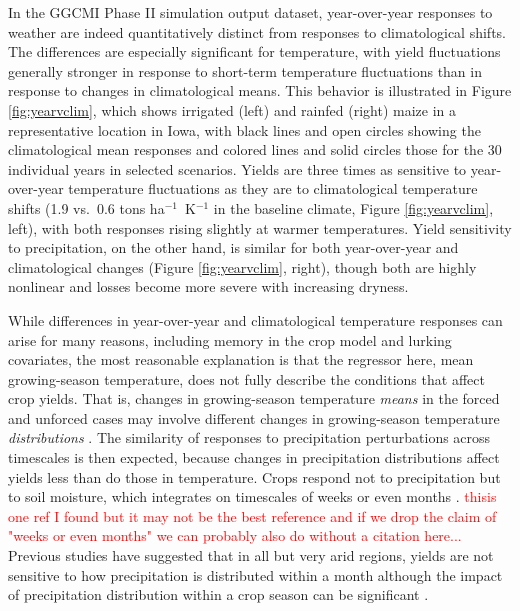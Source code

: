\documentclass[gmd, manuscript]{copernicus} %
\begin{document}
In the GGCMI Phase II simulation output dataset, year-over-year responses to weather are indeed quantitatively distinct from  responses to climatological shifts. 
The differences are especially significant for temperature, with yield fluctuations generally stronger in response to short-term temperature fluctuations than in response to changes in climatological means. 
This behavior is illustrated in Figure \ref{fig:yearvclim}, which shows irrigated (left) and rainfed (right) maize in a representative location in Iowa, with black lines and open circles showing the climatological mean responses and colored lines and solid circles those for the 30 individual years in selected scenarios. Yields are three times as sensitive to year-over-year temperature fluctuations as they are to climatological  temperature shifts (1.9 vs.\ 0.6 tons ha$^{-1}$\ K$^{-1}$ in the baseline climate, Figure \ref{fig:yearvclim}, left), with both responses rising slightly at warmer temperatures.
Yield sensitivity to precipitation, on the other hand, is similar for both year-over-year and climatological changes (Figure \ref{fig:yearvclim}, right), though both are highly nonlinear and losses become more severe with increasing dryness. 

While differences in year-over-year and climatological temperature responses can arise for many reasons, including memory in the crop model and lurking covariates, the most reasonable explanation is that the regressor here, mean growing-season temperature, does not fully describe the conditions that affect crop yields. That is, changes in growing-season temperature \textit{means} in the forced and unforced cases may involve different changes in growing-season temperature \textit{distributions} \citep[e.g.][]{Ruane2016}. 
The similarity of responses to precipitation perturbations across timescales is then expected, because changes in precipitation distributions affect yields less than do those in temperature. 
Crops respond not to precipitation but to soil moisture, which integrates on timescales of weeks or even months \citep[e.g.][]{potter2005effects}. \textcolor{red}{thisis one ref I found but it may not be the best reference and if we drop the claim of "weeks or even months" we can probably also do without a citation here...}
Previous studies have suggested that in all but very arid regions, yields are not sensitive to how precipitation is distributed within a month \citep{Glotter14} although the impact of precipitation distribution within a crop season can be significant \citep{CHALLINOR200499}.
\end{document}
